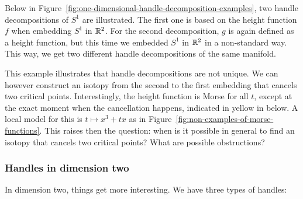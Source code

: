 \begin{eg}
    Below in Figure~\ref{fig:one-dimensional-handle-decomposition-examples}, two handle decompositions of $S^{1}$ are illustrated.
    The first one is based on the height function $f$ when embedding $S^{1}$ in $\mathbb{R}^2$.
    For the second decomposition, $g$ is again defined as a height function, but this time we embedded $S^{1}$ in $ \mathbb{R}^2$ in a non-standard way.
    This way, we get two different handle decompositions of the same manifold.
\end{eg}
\begin{figure}[H]
    \centering
\end{figure}
This example illustrates that handle decompositions are not unique.
We can however construct an isotopy from the second to the first embedding that cancels two critical points.
Interestingly, the height function is Morse for all $t$, except at the exact moment when the cancellation happens, indicated in yellow in below.
A local model for this is $t\mapsto x^3 + tx$ as in Figure~\ref{fig:non-examples-of-morse-functions}.
This raises then the question: when is it possible in general to find an isotopy that cancels two critical points? What are possible obstructions?
\begin{figure}[H]
    \centering
\end{figure}


\subsubsection*{Handles in dimension two}
In dimension two, things get more interesting.
We have three types of handles:

